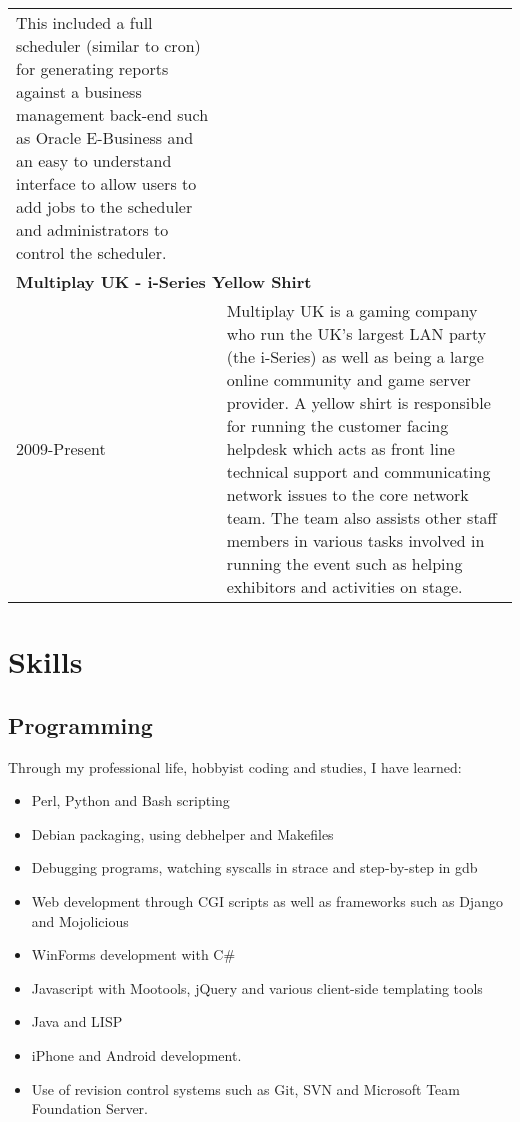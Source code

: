 \documentclass[11pt]{report}
\begin{document}
\begin{tabularx}{\textwidth}{l X}
This included a full scheduler (similar to cron) for generating reports against a business management back-end such as Oracle E-Business
and an easy to understand interface to allow users to add jobs to the scheduler and administrators to control the scheduler. \\
\multicolumn{2}{l}{\bf Multiplay UK - i-Series Yellow Shirt} \\
2009-Present & Multiplay UK is a gaming company who run the UK's largest LAN party (the i-Series) as well as being a large online community and game server provider.
A yellow shirt is responsible for running the customer facing helpdesk which acts as front line technical support and communicating network issues to the core network team.
The team also assists other staff members in various tasks involved in running the event such as helping exhibitors and activities on stage.
\end{tabularx}
\newpage
\section*{Skills}
\subsection*{Programming}
Through my professional life, hobbyist coding and studies, I have learned: 
\begin{itemize}[itemsep=2pt ,parsep=2pt]
\item Perl, Python and Bash scripting
\item Debian packaging, using {\ttfamily debhelper} and Makefiles
\item Debugging programs, watching syscalls in {\ttfamily strace} and step-by-step in {\ttfamily gdb}
\item Web development through CGI scripts as well as frameworks such as Django and Mojolicious
\item WinForms development with C\#
\item Javascript with Mootools, jQuery and various client-side templating tools
\item Java and LISP
\item iPhone and Android development.
\item Use of revision control systems such as Git, SVN and Microsoft Team Foundation Server.
\end{itemize}
\end{document}
